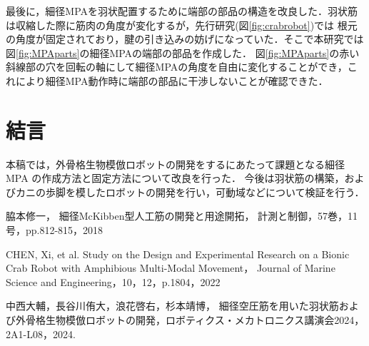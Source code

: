 \documentclass{jarticle}
\begin{document}
最後に，細径MPAを羽状配置するために端部の部品の構造を改良した．羽状筋は収縮した際に筋肉の角度が変化するが，先行研究(図\ref{fig:crabrobot})では
根元の角度が固定されており，腱の引き込みの妨げになっていた．そこで本研究では図\ref{fig:MPAparts}の細径MPAの端部の部品を作成した．
図\ref{fig:MPAparts}の赤い斜線部の穴を回転の軸にして細径MPAの角度を自由に変化することができ，これにより細径MPA動作時に端部の部品に干渉しないことが確認できた．

\vspace*{-2mm}
\section{結言}

本稿では，外骨格生物模倣ロボットの開発をするにあたって課題となる細径MPA の作成方法と固定方法について改良を行った．
今後は羽状筋の構築，およびカニの歩脚を模したロボットの開発を行い，可動域などについて検証を行う．

\begin{thebibliography}{99}

  脇本修一，
  細径McKibben型人工筋の開発と用途開拓，
  計測と制御，57巻，11号，pp.812-815，2018
  
  CHEN, Xi, et al. Study on the Design and Experimental Research on a Bionic Crab Robot with Amphibious Multi-Modal Movement， Journal of Marine Science and Engineering，10，12，p.1804，2022
  
  中西大輔，長谷川侑大，浪花啓右，杉本靖博，
  細径空圧筋を用いた羽状筋および外骨格生物模倣ロボットの開発，ロボティクス・メカトロニクス講演会2024，2A1-L08，2024.

 \end{thebibliography}
\end{document}
